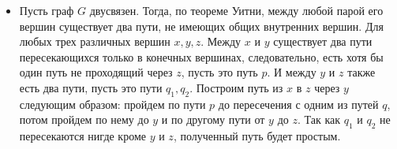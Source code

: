 \documentclass[10pt]{article}
\begin{document}
\begin{enumerate}
\begin{itemize}
	\item Пусть граф $G$ двусвязен. Тогда, по теореме Уитни, между любой парой его вершин существует два пути, не имеющих общих внутренних вершин. Для любых трех различных вершин $x, y, z$. Между $x$ и $y$ существует два пути пересекающихся только в конечных вершинах, следовательно, есть хотя бы один путь не проходящий через $z$, пусть это путь $p$. И между $y$ и $z$ также есть два пути, пусть это пути $q_1, q_2$. Построим путь из $x$ в $z$ через $y$ следующим образом: пройдем по пути $p$ до пересечения с одним из путей $q$, потом пройдем по нему до $y$ и по другому пути от $y$ до $z$. Так как $q_1$ и $q_2$ не пересекаются нигде кроме $y$ и $z$, полученный путь будет простым.
	
\end{itemize}
\end{enumerate}
\end{document}
